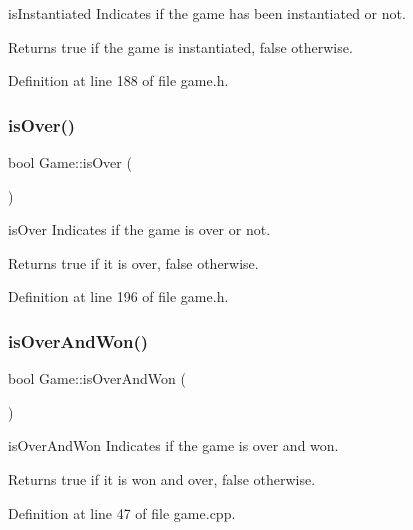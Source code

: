 is\+Instantiated Indicates if the game has been instantiated or not. 

\begin{DoxyReturn}{Returns}
true if the game is instantiated, false otherwise. 
\end{DoxyReturn}


Definition at line 188 of file game.\+h.

\mbox{\label{class_game_ab8536df425c768f3524c87de99aa9cd9}} 
\subsubsection{\texorpdfstring{is\+Over()}{isOver()}}
{\footnotesize\ttfamily bool Game\+::is\+Over (\begin{DoxyParamCaption}{ }\end{DoxyParamCaption})\hspace{0.3cm}{\ttfamily [inline]}}



is\+Over Indicates if the game is over or not. 

\begin{DoxyReturn}{Returns}
true if it is over, false otherwise. 
\end{DoxyReturn}


Definition at line 196 of file game.\+h.

\mbox{\label{class_game_a9c1972964aca515fabb01f93841d018c}} 
\subsubsection{\texorpdfstring{is\+Over\+And\+Won()}{isOverAndWon()}}
{\footnotesize\ttfamily bool Game\+::is\+Over\+And\+Won (\begin{DoxyParamCaption}{ }\end{DoxyParamCaption})}



is\+Over\+And\+Won Indicates if the game is over and won. 

\begin{DoxyReturn}{Returns}
true if it is won and over, false otherwise. 
\end{DoxyReturn}


Definition at line 47 of file game.\+cpp.

